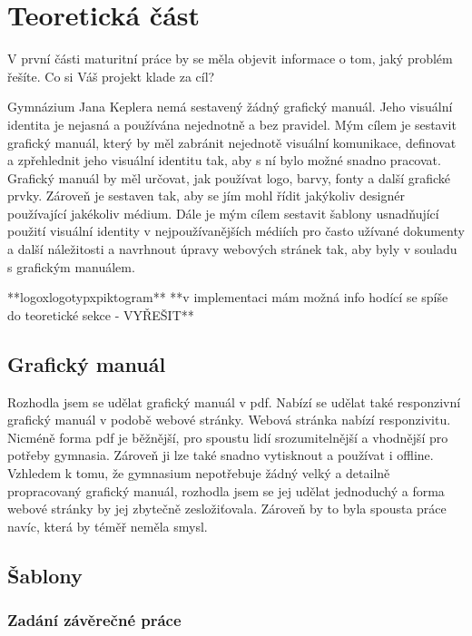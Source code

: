 \documentclass[11pt,a4paper,twoside,openright]{report}
\begin{document}


\setcounter{tocdepth}{2}
\tableofcontents

\chapter{Teoretická část}
\pagestyle{fancy}

V první části maturitní práce by se měla objevit informace o tom, jaký problém řešíte. Co si Váš projekt klade za cíl?

Gymnázium Jana Keplera nemá sestavený žádný grafický manuál. Jeho visuální identita je nejasná a používána nejednotně a bez pravidel. Mým cílem je sestavit grafický manuál, který by měl zabránit nejednotě visuální komunikace, definovat a zpřehlednit jeho visuální identitu tak, aby s ní bylo možné snadno pracovat. Grafický manuál by měl určovat, jak používat logo, barvy, fonty a další grafické prvky. Zároveň je sestaven tak, aby se jím mohl řídit jakýkoliv designér používající jakékoliv médium.
Dále je mým cílem sestavit šablony usnadňující použití visuální identity v nejpoužívanějších médiích pro často užívané dokumenty a další náležitosti a navrhnout úpravy webových stránek tak, aby byly v souladu s grafickým manuálem.

**logoxlogotypxpiktogram**
**v implementaci mám možná info hodící se spíše do teoretické sekce - VYŘEŠIT**

\section{Grafický manuál}
Rozhodla jsem se udělat grafický manuál v pdf. Nabízí se udělat také responzivní grafický manuál v podobě webové stránky. Webová stránka nabízí responzivitu. Nicméně forma pdf je běžnější, pro spoustu lidí srozumitelnější a vhodnější pro potřeby gymnasia. Zároveň ji lze také snadno vytisknout a používat i offline. Vzhledem k tomu, že gymnasium nepotřebuje žádný velký a detailně propracovaný grafický manuál, rozhodla jsem se jej udělat jednoduchý a forma webové stránky by jej zbytečně zesložiťovala. Zároveň by to byla spousta práce navíc, která by téměř neměla smysl.
\section{Šablony}
\subsection{Zadání závěrečné práce}
\end{document}
